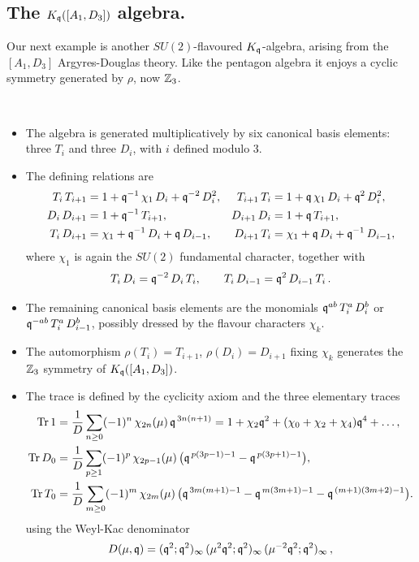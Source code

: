 \documentclass[12pt]{amsart}
\begin{document}
\subsection{The $K_{\mathfrak{q}}([A_1,D_3])$ algebra.}
\label{sec:a1d3}
Our next example is another $SU(2)$-flavoured $K_{\mathfrak{q}}$-algebra, arising from the
$[A_1,D_3]$ Argyres-Douglas theory. Like the pentagon algebra it enjoys a cyclic symmetry generated by $\rho$, now $\mathbb{Z}_3$.
\begin{definition} \,
\begin{itemize}
	\item The algebra is generated multiplicatively by six canonical basis elements: three
$T_i$ and three $D_i$, with $i$ defined modulo $3$. 
	\item The defining relations are
\begin{align}
	T_i\, T_{i+1}   &=  1 + \mathfrak{q}^{-1}\,\chi_1\, D_i + \mathfrak{q}^{-2}\, D_i^2 , &
	T_{i+1}\, T_i   &=  1 + \mathfrak{q}\,\chi_1\, D_i + \mathfrak{q}^{2}\, D_i^2 , \\
	D_i\, D_{i+1}   &=  1 + \mathfrak{q}^{-1}\, T_{i+1} , &
	D_{i+1}\, D_i   &=  1 + \mathfrak{q}\, T_{i+1} , \\
	T_i\, D_{i+1}   &=  \chi_1 + \mathfrak{q}^{-1}\, D_i + \mathfrak{q}\, D_{i-1} , &
	D_{i+1}\, T_i   &=  \chi_1 + \mathfrak{q}\, D_i + \mathfrak{q}^{-1}\, D_{i-1} ,
\end{align}
where $\chi_1$ is again the $SU(2)$ fundamental character, together with
\begin{equation}
	T_i\, D_i = \mathfrak{q}^{-2}\, D_i\, T_i , \qquad
	T_i\, D_{i-1} = \mathfrak{q}^{2}\, D_{i-1}\, T_i \, .
\end{equation}
	\item The remaining canonical basis elements are the monomials
	$\mathfrak{q}^{ab}\, T_i^{a}\, D_{i}^{b}$ or $\mathfrak{q}^{-ab}\, T_i^{a}\, D_{i-1}^{b}$, possibly dressed by the flavour characters $\chi_k$. 
	\item The automorphism $\rho(T_i) = T_{i+1}$, $\rho(D_i) = D_{i+1}$ fixing $\chi_k$ generates the $\mathbb{Z}_3$ symmetry of $K_{\mathfrak{q}}([A_1,D_3])$.
	\item The trace is defined by the cyclicity axiom and the three elementary traces
	 \begin{align}\label{eq:a1d3trace}
	\operatorname{Tr} 1 &= \frac{1}{D}\sum_{n\ge0}(-1)^n\,\chi_{2n}(\mu)\,\mathfrak{q}^{\,3n(n+1)}
	= 1 + \chi_2\mathfrak{q}^2 + (\chi_0+\chi_2+\chi_4)\mathfrak{q}^4 + \ldots , \\
	\operatorname{Tr} D_0 &= \frac{1}{D}\sum_{p\ge1}(-1)^p\,\chi_{2p-1}(\mu)\,
	    \big(\mathfrak{q}^{\,p(3p-1)-1}-\mathfrak{q}^{\,p(3p+1)-1}\big) , \\
	\operatorname{Tr} T_0 &= \frac{1}{D}\sum_{m\ge0}(-1)^m\,\chi_{2m}(\mu)\,
	    \big(\mathfrak{q}^{\,3m(m+1)-1}-\mathfrak{q}^{\,m(3m+1)-1}-\mathfrak{q}^{\,(m+1)(3m+2)-1}\big) .
	\end{align}
	using the Weyl-Kac denominator
	\begin{equation}
	D(\mu,\mathfrak{q}) = (\mathfrak{q}^2;\mathfrak{q}^2)_\infty\,(\mu^2\mathfrak{q}^2;\mathfrak{q}^2)_\infty\,
	             (\mu^{-2}\mathfrak{q}^2;\mathfrak{q}^2)_\infty \, ,
	\end{equation}
\end{itemize}
\end{definition}
\end{document}
